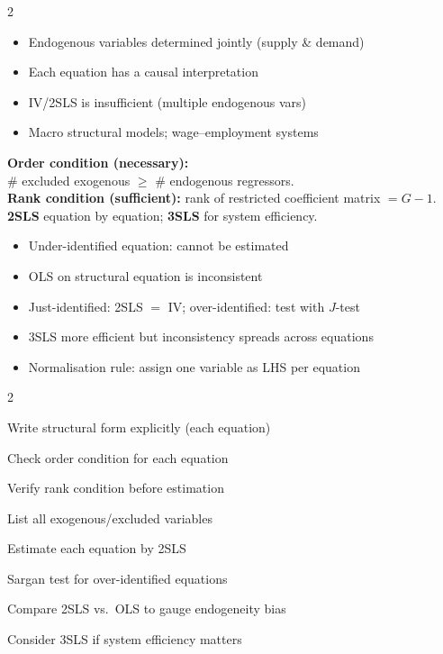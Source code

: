\documentclass[10pt,a4paper]{article}
\begin{document}
\begin{multicols}{2}

\begin{tcolorbox}[when]
\begin{itemize}
  \item Endogenous variables determined jointly (supply \& demand)
  \item Each equation has a causal interpretation
  \item IV/2SLS is insufficient (multiple endogenous vars)
  \item Macro structural models; wage--employment systems
\end{itemize}
\end{tcolorbox}

\begin{tcolorbox}[key]
\textbf{Order condition (necessary):}\\
\# excluded exogenous $\geq$ \# endogenous regressors.\\[4pt]
\textbf{Rank condition (sufficient):} rank of restricted coefficient matrix $= G-1$.\\[4pt]
\textbf{2SLS} equation by equation; \textbf{3SLS} for system efficiency.
\end{tcolorbox}

\columnbreak

\begin{tcolorbox}[watchout]
\begin{itemize}
  \item Under-identified equation: cannot be estimated
  \item OLS on structural equation is inconsistent
  \item Just-identified: 2SLS $=$ IV; over-identified: test with $J$-test
  \item 3SLS more efficient but inconsistency spreads across equations
  \item Normalisation rule: assign one variable as LHS per equation
\end{itemize}
\end{tcolorbox}

\end{multicols}

\begin{tcolorbox}[checklist]
\begin{multicols}{2}
\begin{checklist}
  \item Write structural form explicitly (each equation)
  \item Check order condition for each equation
  \item Verify rank condition before estimation
  \item List all exogenous/excluded variables
  \item Estimate each equation by 2SLS
  \item Sargan test for over-identified equations
  \item Compare 2SLS vs.\ OLS to gauge endogeneity bias
  \item Consider 3SLS if system efficiency matters
\end{checklist}
\end{multicols}
\end{tcolorbox}
\end{document}
